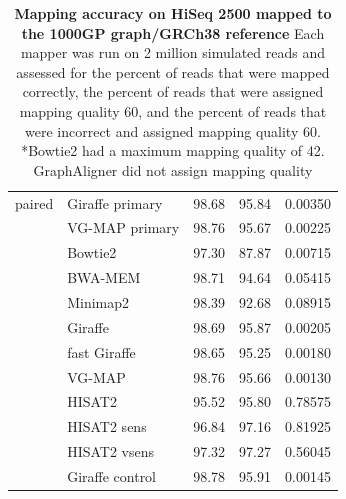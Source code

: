 \documentclass[11pt]{ucscthesis}
\begin{document}
\begin{table}[p]
\begin{tabular}{|l|l|r|r|r|}
        \hline
        paired  & Giraffe primary	& 98.68     & 95.84     & 0.00350 \\
                & VG-MAP primary   	& 98.76     & 95.67     & 0.00225 \\
                & Bowtie2	        & 97.30     & 87.87     & 0.00715 \\
                & BWA-MEM       	& 98.71     & 94.64     & 0.05415 \\
                & Minimap2      	& 98.39     & 92.68     & 0.08915 \\
                & Giraffe	        & 98.69     & 95.87     & 0.00205 \\
                & fast Giraffe  	& 98.65     & 95.25     & 0.00180 \\
                & VG-MAP	        & 98.76     & 95.66     & 0.00130 \\
                & HISAT2        	& 95.52     & 95.80     & 0.78575 \\
                & HISAT2 sens	    & 96.84     & 97.16     & 0.81925 \\
                & HISAT2 vsens	    & 97.32     & 97.27     & 0.56045 \\
                & Giraffe control	& 98.78     & 95.91     & 0.00145 \\

        \hline
        
    \end{tabular}
    \caption[Mapping accuracy on HiSeq 2500 reads mapped to the 1000GP graph/GRCh38 reference]{\textbf{Mapping accuracy on HiSeq 2500 mapped to the 1000GP graph/GRCh38 reference} Each mapper was run on 2 million simulated reads and assessed for the percent of reads that were mapped correctly, the percent of reads that were assigned mapping quality 60, and the percent of reads that were incorrect and assigned mapping quality 60. *Bowtie2 had a maximum mapping quality of 42. GraphAligner did not assign mapping quality}
    \label{tab:mapping_accuracy_1kg_hiseq2500}
\end{table}
\end{document}

